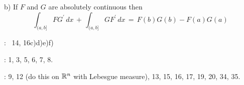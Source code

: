 \smallskip
b)  If  $F$ and $G$ are absolutely continuous then 
$$ \int_{(a, b]} F G^{\prime} \, dx \,+\,  \int_{(a, b]} G F^{\prime} \, dx \, =\, F(b)G(b) - F(a)G(a) $$

\bigskip

:  \, 14, 16c)d)e)f) 
 
 \bigskip
 
 \bigskip
 
 \endhead
\medskip

:  1, 3, 5, 6, 7, 8.


\endhead
\medskip

: 9,  12 (do this on $\Bbb R^n$ with Lebesgue measure), 13, 15, 16, 17, 19, 20, 34, 35.



 
 \enddocument



                                               













